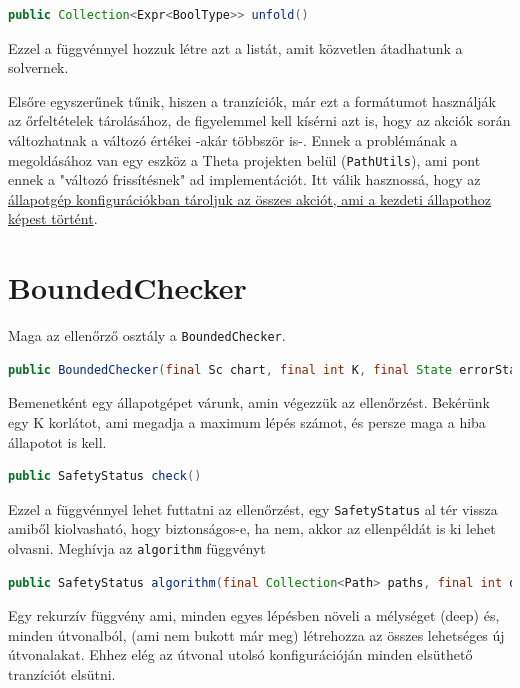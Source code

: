 \begin{lstlisting}[language=java,breaklines=true]
public Collection<Expr<BoolType>> unfold()
\end{lstlisting}

Ezzel a függvénnyel hozzuk létre azt a listát, amit közvetlen átadhatunk a solvernek. 

Elsőre egyszerűnek tűnik, hiszen a tranzíciók, már ezt a formátumot használják az őrfeltételek tárolásához, de figyelemmel kell kísérni azt is, hogy az akciók során változhatnak a változó értékei -akár többször is-. Ennek a problémának a megoldásához van egy eszköz a Theta projekten belül (\verb+PathUtils+), ami pont ennek a "változó frissítésnek" ad implementációt. Itt válik hasznossá, hogy az \hyperref[sec:stateconfig]{állapotgép konfigurációkban tároljuk az összes akciót, ami a kezdeti állapothoz képest történt}.

\section{BoundedChecker}
Maga az ellenőrző osztály a \verb+BoundedChecker+.

\begin{lstlisting}[language=java,breaklines=true]
public BoundedChecker(final Sc chart, final int K, final State errorState)
\end{lstlisting}

Bemenetként egy állapotgépet várunk, amin végezzük az ellenőrzést. Bekérünk egy K korlátot, ami megadja a maximum lépés számot, és persze maga a hiba állapotot is kell.

\begin{lstlisting}[language=java,breaklines=true]
	public SafetyStatus check()
\end{lstlisting}

Ezzel a függvénnyel lehet futtatni az ellenőrzést, egy \verb+SafetyStatus+ al tér vissza amiből kiolvasható, hogy biztonságos-e, ha nem, akkor az ellenpéldát is ki lehet olvasni. Meghívja az \verb+algorithm+ függvényt

\begin{lstlisting}[language=java,breaklines=true]
public SafetyStatus algorithm(final Collection<Path> paths, final int deep) 
\end{lstlisting}

Egy rekurzív függvény ami, minden egyes lépésben növeli a mélységet (deep) és, minden útvonalból, (ami nem bukott már meg) létrehozza az összes lehetséges új útvonalakat. Ehhez elég az útvonal utolsó konfigurációján minden elsüthető tranzíciót elsütni.

